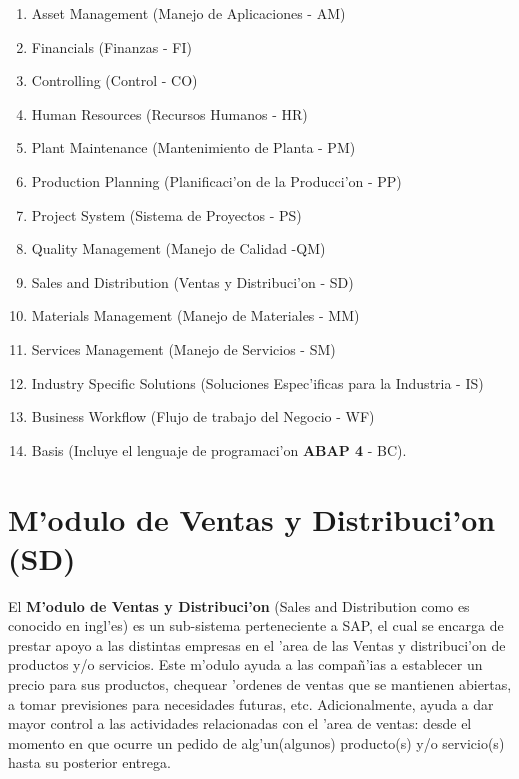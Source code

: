 \begin{enumerate}
\item Asset Management (Manejo de Aplicaciones - AM)
\item Financials (Finanzas - FI)
\item Controlling (Control - CO)
\item Human Resources (Recursos Humanos - HR)
\item Plant Maintenance (Mantenimiento de Planta - PM)
\item Production Planning (Planificaci'on de la Producci'on - PP)
\item Project System (Sistema de Proyectos - PS)
\item Quality Management (Manejo de Calidad -QM)
\item Sales and Distribution (Ventas y Distribuci'on - SD)
\item Materials Management (Manejo de Materiales - MM)
\item Services Management (Manejo de Servicios - SM)
\item Industry Specific Solutions (Soluciones Espec'ificas para la Industria - IS)
\item Business Workflow (Flujo de trabajo del Negocio - WF)
\item Basis (Incluye el lenguaje de programaci'on \textbf{ABAP 4} - BC).

\end{enumerate}

\section{M'odulo de Ventas y Distribuci'on (SD)} \label{sect:sd}

El \textbf{M'odulo de Ventas y Distribuci'on} (Sales and Distribution como es conocido en ingl'es) es un sub-sistema perteneciente a SAP, el cual se encarga de prestar apoyo a las distintas empresas en el 'area de las Ventas y distribuci'on de productos y/o servicios. 
\newline
\newline
Este m'odulo ayuda a las compa\~n'ias a establecer un precio para sus productos, chequear 'ordenes de ventas que se mantienen abiertas, a tomar previsiones para necesidades futuras, etc. Adicionalmente, ayuda a dar mayor control a las actividades relacionadas con el 'area de ventas: desde el momento en que ocurre un pedido de alg'un(algunos) producto(s) y/o servicio(s) hasta su posterior entrega.



